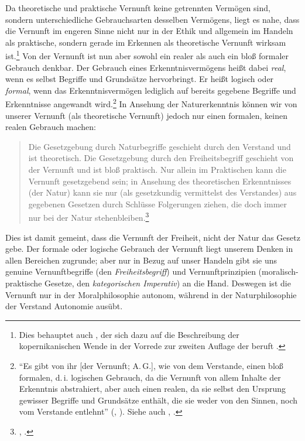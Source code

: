 \begin{nummerierung}
Da theoretische und praktische Vernunft keine getrennten Vermögen sind, sondern
unterschiedliche Gebrauchsarten desselben Vermögens, liegt es nahe, dass die
Vernunft im engeren Sinne nicht nur in der Ethik und allgemein im Handeln als
praktische, sondern gerade im Erkennen als theoretische Vernunft wirksam
ist.\footnote{Dies behauptet auch
, der sich dazu auf die
Beschreibung der kopernikanischen Wende in der Vorrede zur zweiten Auflage der
 beruft
\parencite[vgl.][41]{Larmore:TheAutonomyofMorality2008}.} Von der Vernunft ist
nun aber sowohl ein realer als auch ein bloß formaler Gebrauch denkbar. Der
Gebrauch eines Erkenntnisvermögens heißt dabei \emph{real}, wenn es selbst
Begriffe und Grundsätze hervorbringt. Er heißt logisch oder \emph{formal}, wenn
das Erkenntnisvermögen lediglich auf bereits gegebene Begriffe und Erkenntnisse
angewandt wird.\footnote{\enquote{Es gibt von ihr [der Vernunft; A.\,G.], wie
von dem Verstande, einen bloß formalen, d.\,i. logischen Gebrauch, da die
Vernunft von allem Inhalte der Erkenntnis abstrahiert, aber auch einen realen,
da sie selbst den Ursprung gewisser Begriffe und Grundsätze enthält, die sie
weder von den Sinnen, noch vom Verstande entlehnt} \mkbibparens{\cite[][B
355]{Kant:KritikderreinenVernunft2003}, \cite[][III:
237.26--30]{Kant:GesammelteWerke1900ff.}}. Siehe auch
\cite[][\S~5]{Kant:Demundisensibilisatqueintelligibilisformaetprincipiis1968},
\cite[][II: 393.16--22]{Kant:GesammelteWerke1900ff.}.} In Ansehung der
Naturerkenntnis können wir von unserer Vernunft (als theoretische Vernunft)
jedoch nur einen {formalen}, keinen {realen} Gebrauch machen:
\begin{quote}
Die Gesetzgebung durch Naturbegriffe geschieht durch den Verstand und ist
theoretisch. Die Gesetzgebung durch den Freiheitsbegriff geschieht von der
Vernunft und ist bloß praktisch. Nur allein im Praktischen kann die Vernunft
gesetzgebend sein; in Ansehung des theoretischen Erkenntnisses (der Natur) kann
sie nur (als gesetzkundig vermittelst des Verstandes) aus gegebenen Gesetzen
durch Schlüsse Folgerungen ziehen, die doch immer nur bei der Natur
stehenbleiben.\footnote{\cite[][B xvii]{Kant:KritikderUrteilskraft2009},
\cite[][V: 174.32--175.2]{Kant:GesammelteWerke1900ff.}.}
\end{quote}
Dies ist damit gemeint, dass die Vernunft der Freiheit, nicht der Natur das
Gesetz gebe. Der formale oder logische Gebrauch der Vernunft liegt unserem
Denken in allen Bereichen zugrunde; aber nur in Bezug auf unser Handeln gibt sie
uns genuine Vernunftbegriffe (den \emph{Freiheitsbegriff}) und
Vernunftprinzipien (moralisch-praktische Gesetze, den \emph{kategorischen
Imperativ}) an die Hand. Deswegen ist die Vernunft nur in der
Moralphilosophie autonom, während in der Naturphilosophie der Verstand Autonomie
ausübt.


\end{nummerierung}
